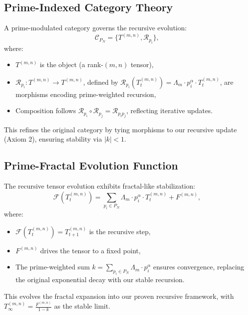 \documentclass{article}
\theoremstyle{plain}
\begin{document}
\subsection{Prime-Indexed Category Theory}
A prime-modulated category governs the recursive evolution:
\begin{equation}
    \mathcal{C}_{P_N} = \{ T^{(m,n)}, \mathcal{R}_{p_i} \},
\end{equation}
where:
\begin{itemize}
    \item \( T^{(m,n)} \) is the object (a rank-$(m,n)$ tensor),
    \item \( \mathcal{R}_{p_i}: T^{(m,n)} \to T^{(m,n)} \), defined by \( \mathcal{R}_{p_i}(T_t^{(m,n)}) = \Lambda_m \cdot p_i^\alpha \cdot T_t^{(m,n)} \), are morphisms encoding prime-weighted recursion,
    \item Composition follows \( \mathcal{R}_{p_i} \circ \mathcal{R}_{p_j} = \mathcal{R}_{p_i p_j} \), reflecting iterative updates.
\end{itemize}
This refines the original category by tying morphisms to our recursive update (Axiom 2), ensuring stability via \( |k| < 1 \).

\subsection{Prime-Fractal Evolution Function}
The recursive tensor evolution exhibits fractal-like stabilization:
\begin{equation}
    \mathcal{F}(T_t^{(m,n)}) = \sum_{p_i \in P_N} \Lambda_m \cdot p_i^\alpha \cdot T_t^{(m,n)} + F^{(m,n)},
\end{equation}
where:
\begin{itemize}
    \item \( \mathcal{F}(T_t^{(m,n)}) = T_{t+1}^{(m,n)} \) is the recursive step,
    \item \( F^{(m,n)} \) drives the tensor to a fixed point,
    \item The prime-weighted sum \( k = \sum_{p_i \in P_N} \Lambda_m \cdot p_i^\alpha \) ensures convergence, replacing the original exponential decay with our stable recursion.
\end{itemize}
This evolves the fractal expansion into our proven recursive framework, with \( T_\infty^{(m,n)} = \frac{F^{(m,n)}}{1 - k} \) as the stable limit.


\nocite{*}


\end{document}
